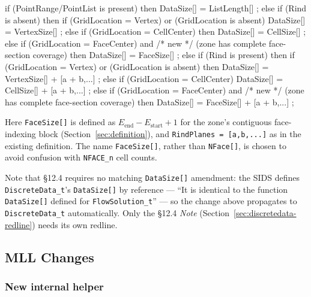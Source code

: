 \documentclass[11pt,letterpaper]{article}
\makeatletter
\let\cgns@orig@lstlisting\lstlisting
\let\cgns@endorig@lstlisting\endlstlisting
\renewenvironment{lstlisting}
  {\par\needspace{5\baselineskip}\nolinenumbers\cgns@orig@lstlisting}
  {\cgns@endorig@lstlisting\par\linenumbers}
\makeatother
\begin{document}
\begin{lstlisting}[language=C]
if (PointRange/PointList is present) then
  {
  DataSize[] = ListLength[] ;
  }
else if (Rind is absent) then
  {
  if (GridLocation = Vertex) or (GridLocation is absent)
    {
    DataSize[] = VertexSize[] ;
    }
  else if (GridLocation = CellCenter) then
    {
    DataSize[] = CellSize[] ;
    }
  else if (GridLocation = FaceCenter) and              /* new */
          (zone has complete face-section coverage) then
    {
    DataSize[] = FaceSize[] ;
    }
  }
else if (Rind is present) then
  {
  if (GridLocation = Vertex) or (GridLocation is absent) then
    {
    DataSize[] = VertexSize[] + [a + b,...] ;
    }
  else if (GridLocation = CellCenter)
    {
    DataSize[] = CellSize[] + [a + b,...] ;
    }
  else if (GridLocation = FaceCenter) and              /* new */
          (zone has complete face-section coverage) then
    {
    DataSize[] = FaceSize[] + [a + b,...] ;
    }
  }
\end{lstlisting}

Here \texttt{FaceSize[]} is defined as
$E_{\mathrm{end}} - E_{\mathrm{start}} + 1$ for the zone's contiguous
face-indexing block (Section~\ref{sec:definition}), and
\texttt{RindPlanes = [a,b,...]} as in the existing definition. The name
\texttt{FaceSize[]}, rather than \texttt{NFace[]}, is chosen to avoid
confusion with \texttt{NFACE\_n} cell counts.

Note that \S12.4 requires no matching \texttt{DataSize[]} amendment: the
SIDS defines \texttt{DiscreteData\_t}'s \texttt{DataSize[]} by reference
--- ``It is identical to the function \texttt{DataSize[]} defined for
\texttt{FlowSolution\_t}'' --- so the change above propagates to
\texttt{DiscreteData\_t} automatically. Only the \S12.4 \emph{Note}
(Section~\ref{sec:discretedata-redline}) needs its own redline.

\subsection{MLL Changes}
\label{sec:mll}

\subsubsection{New internal helper}
\label{sec:mll_helper}
\end{document}
